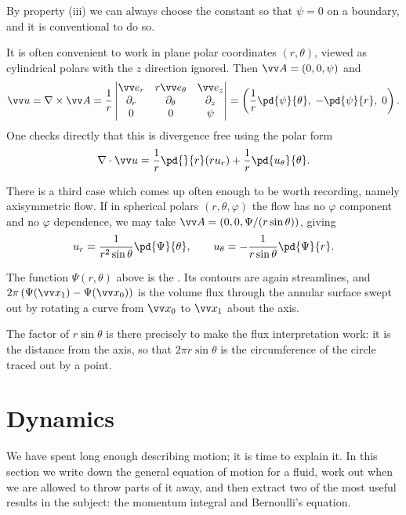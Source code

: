 By property (iii) we can always choose the constant so that $\psi = 0$ on a boundary, and it is conventional to do so.

It is often convenient to work in plane polar coordinates $(r, \theta)$, viewed as cylindrical polars with the $z$ direction ignored. Then $\vv A = (0, 0, \psi)$ and
$$
\vv u = \nabla \times \vv A = \frac{1}{r}\begin{vmatrix} \vv e_r & r\vv e_\theta & \vv e_z \\ \partial_r & \partial_\theta & \partial_z \\ 0 & 0 & \psi \end{vmatrix} = \left(\frac{1}{r}\pd{\psi}{\theta}, \; -\pd{\psi}{r}, \; 0\right).
$$
One checks directly that this is divergence free using the polar form
$$
\nabla \cdot \vv u = \frac{1}{r}\pd{}{r}(r u_r) + \frac{1}{r}\pd{u_\theta}{\theta}.
$$

There is a third case which comes up often enough to be worth recording, namely axisymmetric flow. If in spherical polars $(r, \theta, \varphi)$ the flow has no $\varphi$ component and no $\varphi$ dependence, we may take $\vv A = \left(0, 0, \Psi/(r\sin\theta)\right)$, giving
$$
u_r = \frac{1}{r^2 \sin\theta}\pd{\Psi}{\theta}, \qquad u_\theta = -\frac{1}{r\sin\theta}\pd{\Psi}{r}.
$$

\begin{definition}
	The function $\Psi(r, \theta)$ above is the . Its contours are again streamlines, and $2\pi\left(\Psi(\vv x_1) - \Psi(\vv x_0)\right)$ is the volume flux through the annular surface swept out by rotating a curve from $\vv x_0$ to $\vv x_1$ about the axis.
\end{definition}

The factor of $r\sin\theta$ is there precisely to make the flux interpretation work: it is the distance from the axis, so that $2\pi r \sin\theta$ is the circumference of the circle traced out by a point.

\section{Dynamics}

We have spent long enough describing motion; it is time to explain it. In this section we write down the general equation of motion for a fluid, work out when we are allowed to throw parts of it away, and then extract two of the most useful results in the subject: the momentum integral and Bernoulli's equation.

